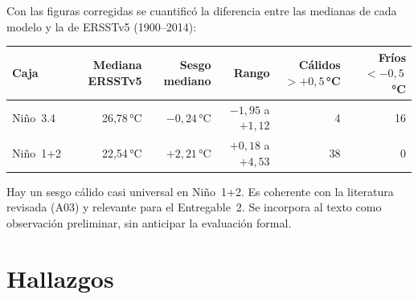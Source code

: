 Con las figuras corregidas se cuantificó la diferencia entre las medianas de cada modelo y la de ERSSTv5 (1900--2014):

\begin{center}\small
\begin{tabular}{@{}lrrrrr@{}}
\toprule
Caja & Mediana ERSSTv5 & Sesgo mediano & Rango & Cálidos $>+0{,}5$\,°C & Fríos $<-0{,}5$\,°C \\
\midrule
Niño~3.4 & 26{,}78\,°C & $-0{,}24$\,°C & $-1{,}95$ a $+1{,}12$ & 4 & 16 \\
Niño~1+2 & 22{,}54\,°C & $+2{,}21$\,°C & $+0{,}18$ a $+4{,}53$ & 38 & 0 \\
\bottomrule
\end{tabular}
\end{center}

Hay un sesgo cálido casi universal en Niño~1+2. Es coherente con la literatura revisada (A03) y relevante para el Entregable~2. Se incorpora al texto como observación preliminar, sin anticipar la evaluación formal.

\section{Hallazgos}

